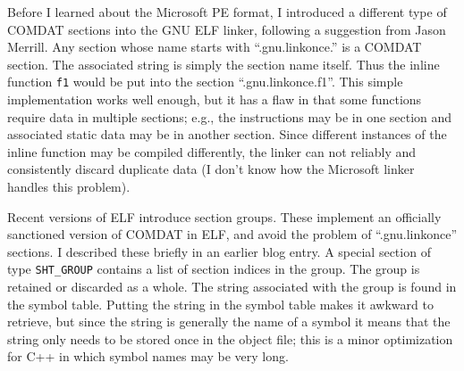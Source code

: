 Before I learned about the Microsoft PE format, I introduced a different type
of COMDAT sections into the GNU ELF linker, following a suggestion from Jason
Merrill. Any section whose name starts with ``.gnu.linkonce.'' is a COMDAT
section. The associated string is simply the section name itself. Thus the
inline function \texttt{f1} would be put into the section ``.gnu.linkonce.f1''.
This simple implementation works well enough, but it has a flaw in that some
functions require data in multiple sections; e.g., the instructions may be
in one section and associated static data may be in another section. Since
different instances of the inline function may be compiled differently, the
linker can not reliably and consistently discard duplicate data (I don't know
how the Microsoft linker handles this problem).

Recent versions of ELF introduce section groups. These implement an officially
sanctioned version of COMDAT in ELF, and avoid the problem of ``.gnu.linkonce''
sections. I described these briefly in an earlier blog entry. A special section
of type \texttt{SHT\_GROUP} contains a list of section indices in the group.
The group is retained or discarded as a whole. The string associated with the
group is found in the symbol table. Putting the string in the symbol table
makes it awkward to retrieve, but since the string is generally the name of
a symbol it means that the string only needs to be stored once in the object
file; this is a minor optimization for C++ in which symbol names may be very
long.
